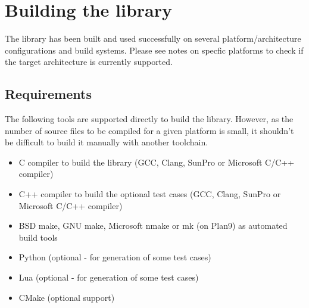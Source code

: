 %
%
%
%

\clearpage
\section{Building the library}

The library has been built and used successfully on several 
platform/architecture configurations and build systems.
Please see notes on specfic platforms to check if the target
architecture is currently supported.


\subsection{Requirements}

The following tools are supported directly to build the  library.
However, as the number of source files to be compiled for a given
platform is small, it shouldn't be difficult to build it manually with
another toolchain.
\begin{itemize}
\item C compiler to build the  library (GCC, Clang, SunPro or Microsoft C/C++ compiler)
\item C++ compiler to build the optional test cases (GCC, Clang, SunPro or Microsoft C/C++ compiler)
\item BSD make, GNU make, Microsoft nmake or mk (on Plan9) as automated build tools
\item Python (optional - for generation of some test cases)
\item Lua (optional - for generation of some test cases)
\item CMake (optional support)
\end{itemize}


